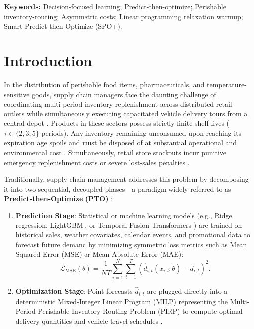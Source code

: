 \documentclass[11pt,a4paper]{article}
\theoremstyle{definition}
\theoremstyle{remark}
\begin{document}
\textbf{Keywords:} Decision-focused learning; Predict-then-optimize; Perishable inventory-routing; Asymmetric costs; Linear programming relaxation warmup; Smart Predict-then-Optimize (SPO+).

\newpage

\section{Introduction}
\label{sec:introduction}

In the distribution of perishable food items, pharmaceuticals, and temperature-sensitive goods, supply chain managers face the daunting challenge of coordinating multi-period inventory replenishment across distributed retail outlets while simultaneously executing capacitated vehicle delivery tours from a central depot \citep{nahmias1982perishable,coelho2014optimal,amorim2012multiobjective}. Products in these sectors possess strictly finite shelf lives ($\tau \in \{2, 3, 5\}$ periods). Any inventory remaining unconsumed upon reaching its expiration age spoils and must be disposed of at substantial operational and environmental cost \citep{soysal2015modeling,liu2021sustainable}. Simultaneously, retail store stockouts incur punitive emergency replenishment costs or severe lost-sales penalties \citep{bertazzi2013stochastic,archetti2018stochastic}.

Traditionally, supply chain management addresses this problem by decomposing it into two sequential, decoupled phases—a paradigm widely referred to as \textbf{Predict-then-Optimize (PTO)} \citep{elmachtoub2022smart,mandi2024decision}:
\begin{enumerate}[label=(\roman*)]
    \item \textbf{Prediction Stage}: Statistical or machine learning models (e.g., Ridge regression, LightGBM \citep{ke2017lightgbm}, or Temporal Fusion Transformers \citep{lim2021temporal}) are trained on historical sales, weather covariates, calendar events, and promotional data to forecast future demand by minimizing symmetric loss metrics such as Mean Squared Error (MSE) or Mean Absolute Error (MAE):
    \begin{equation*}
        \mathcal{L}_{\text{MSE}}(\theta) = \frac{1}{N T} \sum_{i=1}^N \sum_{t=1}^T \left( \hat{d}_{i,t}(x_{i,t}; \theta) - d_{i,t} \right)^2.
    \end{equation*}
    \item \textbf{Optimization Stage}: Point forecasts $\hat{d}_{i,t}$ are plugged directly into a deterministic Mixed-Integer Linear Program (MILP) representing the Multi-Period Perishable Inventory-Routing Problem (PIRP) to compute optimal delivery quantities and vehicle travel schedules \citep{coelho2014thirty,alvarez2020formulations}.
\end{enumerate}
\end{document}
